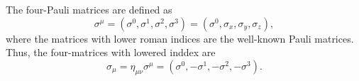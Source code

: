 \begin{remark}
  The four-Pauli matrices are defined as
  \begin{equation}
    \sigma^{\mu} = (\sigma^0, \sigma^1, \sigma^2, \sigma^{3}) = (\sigma^0, \sigma_x, \sigma_y, \sigma_z),
  \end{equation}
  where the matrices with lower roman indices are the well-known Pauli matrices.
  Thus, the four-matrices with lowered inddex are
  \begin{equation}
    \sigma_{\mu} = \eta_{\mu \nu} \sigma^{\mu} = (\sigma^0, -\sigma^1, -\sigma^2, -\sigma^{3}).
  \end{equation}
\end{remark}
